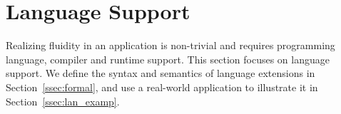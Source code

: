 \section{Language Support}
\label{sec:fluid_lang}

Realizing fluidity in an application is non-trivial and requires programming language, compiler and runtime support. This section focuses on language support.
We define the syntax and semantics of language extensions in Section~\ref{ssec:formal}, and use a real-world application to illustrate it in Section~\ref{ssec:lan_examp}.


